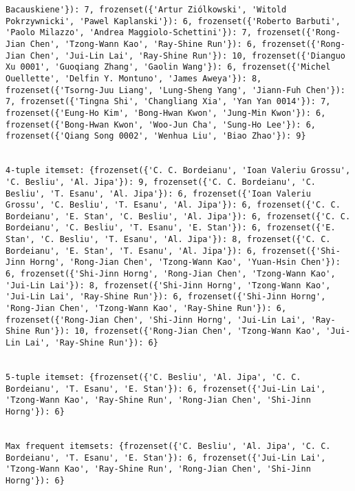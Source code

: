 \documentclass[11pt]{article}
\begin{document}
\begin{verbatim}
Bacauskiene'}): 7, frozenset({'Artur Ziólkowski', 'Witold Pokrzywnicki', 'Pawel Kaplanski'}): 6, frozenset({'Roberto Barbuti', 'Paolo Milazzo', 'Andrea Maggiolo-Schettini'}): 7, frozenset({'Rong-Jian Chen', 'Tzong-Wann Kao', 'Ray-Shine Run'}): 6, frozenset({'Rong-Jian Chen', 'Jui-Lin Lai', 'Ray-Shine Run'}): 10, frozenset({'Dianguo Xu 0001', 'Guoqiang Zhang', 'Gaolin Wang'}): 6, frozenset({'Michel Ouellette', 'Delfin Y. Montuno', 'James Aweya'}): 8, frozenset({'Tsorng-Juu Liang', 'Lung-Sheng Yang', 'Jiann-Fuh Chen'}): 7, frozenset({'Tingna Shi', 'Changliang Xia', 'Yan Yan 0014'}): 7, frozenset({'Eung-Ho Kim', 'Bong-Hwan Kwon', 'Jung-Min Kwon'}): 6, frozenset({'Bong-Hwan Kwon', 'Woo-Jun Cha', 'Sung-Ho Lee'}): 6, frozenset({'Qiang Song 0002', 'Wenhua Liu', 'Biao Zhao'}): 9}


4-tuple itemset: {frozenset({'C. C. Bordeianu', 'Ioan Valeriu Grossu', 'C. Besliu', 'Al. Jipa'}): 9, frozenset({'C. C. Bordeianu', 'C. Besliu', 'T. Esanu', 'Al. Jipa'}): 6, frozenset({'Ioan Valeriu Grossu', 'C. Besliu', 'T. Esanu', 'Al. Jipa'}): 6, frozenset({'C. C. Bordeianu', 'E. Stan', 'C. Besliu', 'Al. Jipa'}): 6, frozenset({'C. C. Bordeianu', 'C. Besliu', 'T. Esanu', 'E. Stan'}): 6, frozenset({'E. Stan', 'C. Besliu', 'T. Esanu', 'Al. Jipa'}): 8, frozenset({'C. C. Bordeianu', 'E. Stan', 'T. Esanu', 'Al. Jipa'}): 6, frozenset({'Shi-Jinn Horng', 'Rong-Jian Chen', 'Tzong-Wann Kao', 'Yuan-Hsin Chen'}): 6, frozenset({'Shi-Jinn Horng', 'Rong-Jian Chen', 'Tzong-Wann Kao', 'Jui-Lin Lai'}): 8, frozenset({'Shi-Jinn Horng', 'Tzong-Wann Kao', 'Jui-Lin Lai', 'Ray-Shine Run'}): 6, frozenset({'Shi-Jinn Horng', 'Rong-Jian Chen', 'Tzong-Wann Kao', 'Ray-Shine Run'}): 6, frozenset({'Rong-Jian Chen', 'Shi-Jinn Horng', 'Jui-Lin Lai', 'Ray-Shine Run'}): 10, frozenset({'Rong-Jian Chen', 'Tzong-Wann Kao', 'Jui-Lin Lai', 'Ray-Shine Run'}): 6}


5-tuple itemset: {frozenset({'C. Besliu', 'Al. Jipa', 'C. C. Bordeianu', 'T. Esanu', 'E. Stan'}): 6, frozenset({'Jui-Lin Lai', 'Tzong-Wann Kao', 'Ray-Shine Run', 'Rong-Jian Chen', 'Shi-Jinn Horng'}): 6}


Max frequent itemsets: {frozenset({'C. Besliu', 'Al. Jipa', 'C. C. Bordeianu', 'T. Esanu', 'E. Stan'}): 6, frozenset({'Jui-Lin Lai', 'Tzong-Wann Kao', 'Ray-Shine Run', 'Rong-Jian Chen', 'Shi-Jinn Horng'}): 6}
\end{verbatim}
\end{document}
